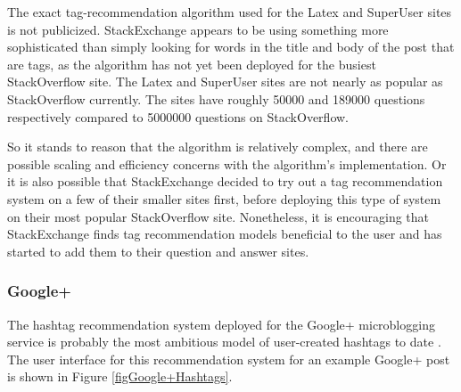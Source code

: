 \documentclass[man,floatsintext,donotrepeattitle]{apa6}
\begin{document}
The exact tag-recommendation algorithm used for the Latex and SuperUser sites is not publicized.
StackExchange appears to be using something more sophisticated than simply looking for words in the title and body of the post that are tags, as the algorithm has not yet been deployed for the busiest StackOverflow site.
The Latex and SuperUser sites are not nearly as popular as StackOverflow currently.
The sites have roughly \num{50000} and \num{189000} questions respectively compared to \num{5000000} questions on StackOverflow.

So it stands to reason that the algorithm is relatively complex, and there are possible scaling and efficiency concerns with the algorithm's implementation.
Or it is also possible that StackExchange decided to try out a tag recommendation system on a few of their smaller sites first, before deploying this type of system on their most popular StackOverflow site.
Nonetheless, it is encouraging that StackExchange finds tag recommendation models beneficial to the user and has started to add them to their question and answer sites. 

\subsubsection{Google+}

The hashtag recommendation system deployed for the Google+ microblogging service is probably the most ambitious model of user-created hashtags to date \parencite{GoogleKeynote2013}.
The user interface for this recommendation system for an example Google+ post is shown in Figure \ref{figGoogle+Hashtags}.
\end{document}
